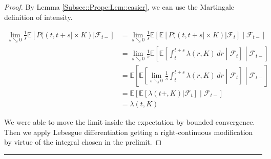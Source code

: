 \documentclass[12pt]{article}
\newcommand{\mb}{\mathbb}
\newcommand{\mc}{\mathcal}
\newcommand{\lin}{\rule{\linewidth}{0.4 pt}}
\newcommand{\ex}[1]{\mb{E}\left[#1\right]}			%
\renewcommand{\t}{t}							%
\renewcommand{\tt}{s}							%
\newcommand{\F}{\mc{F}}							%
\newcommand{\ts}[1]{_{#1}}						%
\newcommand{\rate}{\lambda}						%
\newcommand{\rp}{P}								%
\begin{document}
\begin{proof}
By Lemma \ref{Subsec::Prope:Lem::easier}, we can use the Martingale definition of intensity.

\begin{align*}
\lim_{\tt\searrow 0}\frac{1}{\tt}\ex{\rp((\t,\t+\tt]\times K)|\F\ts{\t-}}& = \lim_{\tt\searrow 0}\frac{1}{\tt}\ex{\ex{\rp((\t,\t+\tt]\times K)|\F\ts{\t}}\middle|\F\ts{\t-}}\\
&= \lim_{\tt\searrow 0}\frac{1}{\tt}\ex{\ex{\int_{\t}^{\t+\tt} \rate(r,K)\,dr\middle|\F\ts{\t}}\middle|\F\ts{\t-}}\\
&= \ex{\ex{\lim_{\tt \searrow 0} \frac{1}{\tt}\int_{\t}^{\t+\tt} \rate(r,K)\,dr\middle|\F\ts{\t}}\middle|\F\ts{\t-}}\\
&=\ex{\ex{\rate(\t+,K)|\F\ts{\t}}\middle|\F\ts{\t-}}\\
&=\rate(\t,K)
\end{align*}

We were able to move the limit inside the expectation by bounded convergence. Then we apply Lebesgue differentiation getting a right-continuous modification by virtue of the integral chosen in the prelimit.
\end{proof}

\lin
\end{document}
